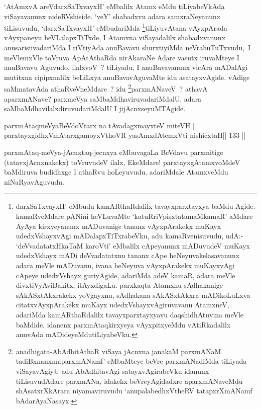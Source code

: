 \begin{artha}
`AtAmxvA areVdarxSaTxvayxH' eMbalilx Atamx eMdu tiLiyabeVkAda viSayavanunx nideRVshiside. `veY' shabadxvu adara samxraNeyanunx tiLisuvudu, `darxSaTxvayxH' eMbudariMda \footnote{darxSaTxvayxH' eMbudu kamARthaRdalilx tavayxparxtayxya baMdu Agide. kamaRveMdare pANini heVLuvaMte `katuRriVpisxtatamaMkamaR' aMdare AyAya kirxyeyanunx mADuvanige tananx vAyxpArakekx muKayx udedxVshayxvAgi mADalapxTiTxrabeVku, adu kamaRvenisuvudu, udA:- `deVvadatatxHkaTaM karoVti' eMbalilx cApeyanunx mADuvudeV muKayx udedxVshayx mADi deVvadatatxnu tananx cApe heNeyuva\break kelasavanunx adara meVle mADuvanu, ivana heNeyuva vAyxpArakekx muKayxvAgi cApeye udedxVshayx guriyAgide, adariMda adeV kamaR, adara meVle divxtiVyAviBakitx, itAyxdigaLu. parxkaqta Atamxnu sAdhakanige sAkASxtAkxrakekx yoVgayxnu, sAdhakana sAkASxtAkxra mADikoLuLxva citatxvAyxpArakekx muKayx udedxVshayxvAgiruvavanu AtamxneV, adariMda kamARthaRdalilx tavayxparxtayxyavu daqshidhAtuvina meVle baMdide. idanenx parxmAtaqkirxyeya vAyxpitxyeMdu vAtiRkadalilx anuvAda mADideyeMdu\break tiLiyabeVku.}tiLiyuvAtana vAyxpArada vAyxpaneyu heVLalapxTiTxde, I Atamxna viSayadalilx shabadxvanunx anusarisuvadariMda I riVtiyAda anuBavavu shurxtiyiMda neVra\break huTuTxvudu,\ I meVlemxVle toVruva ApAtAthaRda nirAkaraNe \mdash Adare vasutx iruvaMteye I anuBavavu Aguvudo, ilalxvoV~? tiLiyadu, I anuBavavanunx vicAra mADalAgi mutitxna cipipxnalilx beLiLxya anuBavavAguvaMte idu asatayxvAgide. vAdige saMmatavAda athaRveVneMdare~? idu \footnote{anadhigata-AbAdhitAthaR viSaya jAcnxna janakaM parxmANaM tadiBxnanxmaparxmANamf' eMbaMteye beVre parxmANadiMda tiLiyada viSayavAgiyU adu AbAdhitavAgi satayxvAgirabeVku idanunx tiLisuvudAdare parxmANa, idakekx beVreyAgidadxre aparxmANaveMdu shAsatxrXkArara niyamaviruvudu `anupalabedhxV\s theRV tatapxrXmANamf bAdarAyaNasayx.}parxmANaveV~? athavA aparxmANave? parxmeVya saMbaMdhaviruvadariMdalU, adara saMbaMdhavilalxdiruvudariMdalU I jijAcnxseyuMTAgide.
\end{artha}

\begin{shl}
parxmAtaqmeVyaBeVdoV\s tarx na tAvadagxmayxteV miteVH |
parxtayxgidhxVmAtarxgamoyxV\s thoVR yasAmxdAtemxVti nishicxtaH\hfill || 133 ||
\end{shl}

\begin{artha}
 parxmAtaq-meVya-jAcnxtaq-jecnxya eMbuvagaLa BeVdavu parxmitige (tatavxjAcnxnakekx) toVruvudeV ilalx, EkeMdare! parxtayxgAtamxvoMdeV baMdiruva budidhxge I athaRvu hoLeyuvudu. adariMdale AtamxveMdu niNaRyavAguvudu.
\end{artha}

